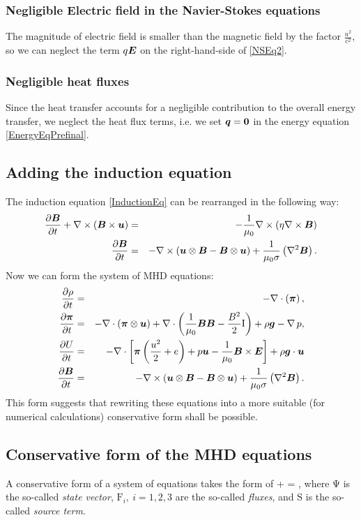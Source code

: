 \subsubsection{Negligible Electric field in the Navier-Stokes equations}
The magnitude of electric field is smaller than the magnetic field by the factor $\frac{u^2}{c^2}$, so we can neglect the term $q\mbox{\boldmath $E$}$ on the right-hand-side of \ref{NSEq2}.

\subsubsection{Negligible heat fluxes}
Since the heat transfer accounts for a negligible contribution to the overall energy transfer, we neglect the heat flux terms, i.e. we set $\mbox{\boldmath $q$} = \mathbf{0}$ in the energy equation \ref{EnergyEqPrefinal}.

\subsection{Adding the induction equation}
The induction equation \ref{InductionEq} can be rearranged in the following way:
\begin{eqnarray}
\frac{\partial{\mbox{\boldmath $B$}}}{\partial{t}} + \nabla \times \left( \mbox{\boldmath $B$} \times \mbox{\boldmath $u$} \right) & = & -\frac{1}{\mu_0} \nabla \times \left( \eta \nabla \times \mbox{\boldmath $B$} \right)\\
\label{InductionPreFinal} \frac{\partial{\mbox{\boldmath $B$}}}{\partial{t}} & = & - \nabla \times \left( \mbox{\boldmath $u$} \otimes \mbox{\boldmath $B$} - \mbox{\boldmath $B$} \otimes \mbox{\boldmath $u$} \right) + \frac{1}{\mu_{0}\sigma} \left( \nabla^2 \mbox{\boldmath $B$} \right).
\end{eqnarray}
Now we can form the system of MHD equations:
\begin{eqnarray}
\label{ContinuityEqFinal} \frac{\partial{\rho}}{\partial{t}} & = & - \nabla\cdot\left(\mbox{\boldmath $\pi$}\right),\\
\label{NSEqFinal} \frac{\partial{\mbox{\boldmath $\pi$}}}{\partial{t}} & = & - \nabla\cdot\left(\mbox{\boldmath $\pi$}\otimes\mbox{\boldmath $u$}\right) + \nabla\cdot\left(\frac{1}{\mu_0}\mbox{\boldmath $B$}\mbox{\boldmath $B$} - \frac{B^2}{2}\mathrm{I}\right) + \rho\mbox{\boldmath $g$} - \nabla\,p,\\
\label{EnergyEqFinal} \frac{\partial{U}}{\partial{t}} & = & -\nabla\cdot\left[\mbox{\boldmath $\pi$}\left( \frac{u^2}{2} + e\right) + p \mbox{\boldmath $u$} - \frac{1}{\mu_0}\mbox{\boldmath $B$}\times\mbox{\boldmath $E$}\right] + \rho \mbox{\boldmath $g$} \cdot \mbox{\boldmath $u$}\\
\label{InductionFinal} \frac{\partial{\mbox{\boldmath $B$}}}{\partial{t}} & = & - \nabla \times \left( \mbox{\boldmath $u$} \otimes \mbox{\boldmath $B$} - \mbox{\boldmath $B$} \otimes \mbox{\boldmath $u$} \right) + \frac{1}{\mu_{0}\sigma} \left( \nabla^2 \mbox{\boldmath $B$} \right).
\end{eqnarray}
This form suggests that rewriting these equations into a more suitable (for numerical calculations) conservative form shall be possible.
\subsection{Conservative form of the MHD equations}
A conservative form of a system of equations takes the form of
\be
\label{conservativeGeneric}  + \nabla \cdot {}\lo\mathrm{\Psi}\ro = ,
\ee
where $\mathrm{\Psi}$ is the so-called \textit{state vector}, $\mathrm{F}_i,\ i = 1, 2, 3$ are the so-called \textit{fluxes}, and $\mathrm{S}$ is the so-called \textit{source term}.
